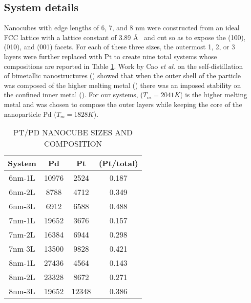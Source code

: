 \subsection{System details}
Nanocubes with edge lengths of 6, 7, and 8 nm were constructed from an ideal
 FCC lattice with a lattice constant of 3.89 \AA~  and cut so as to
expose the (100), (010), and (001) facets. For each of these three sizes, the
outermost 1, 2, or 3 layers were further replaced with Pt to create nine total
systems whose compositions are reported in Table \ref{tab:systems}. Work by Cao
{\it et al.}\citep{Cao:2010gf} on the self-distillation of bimetallic
nanostructures () showed that when the outer shell of the particle
was composed of the higher melting metal () there was an imposed stability on the
confined inner metal (). For our systems,  ($T_m = 2041 K$) is the higher melting
metal and was chosen to compose the outer layers while keeping the core of the
nanoparticle Pd ($T_m = 1828 K$). 


\begin{table}
  \caption{PT/PD NANOCUBE SIZES AND COMPOSITION}
  \centering
  \begin{threeparttable}
  \begin{tabular}{ c ccc }
  \hline
  \hline
  \textbf{System} & \textbf{Pd} & \textbf{Pt} &  \textbf{(Pt/total)} \\
  \hline
  6nm-1L & 10976 & 2524  & 0.187 \\
  6nm-2L & 8788  & 4712  & 0.349 \\
  6nm-3L & 6912  & 6588  & 0.488 \\
  7nm-1L & 19652 & 3676  & 0.157 \\
  7nm-2L & 16384 & 6944  & 0.298 \\
  7nm-3L & 13500 & 9828  & 0.421 \\
  8nm-1L & 27436 & 4564  & 0.143 \\
  8nm-2L & 23328 & 8672  & 0.271 \\
  8nm-3L & 19652 & 12348 & 0.386 \\
  \hline
  \hline
  \end{tabular}
  \end{threeparttable}
\label{tab:systems}
\end{table}

